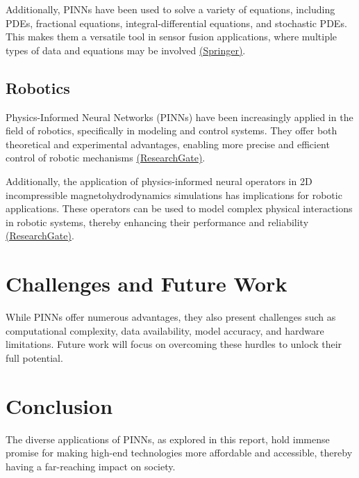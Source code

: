 \documentclass[12pt]{article}
\begin{document}
	Additionally, PINNs have been used to solve a variety of equations, including PDEs, fractional equations, integral-differential equations, and stochastic PDEs. This makes them a versatile tool in sensor fusion applications, where multiple types of data and equations may be involved \href{https://link.springer.com/article/10.1007/s10915-022-01939-z}{(Springer)}.
	
	
	\subsection{Robotics}
	Physics-Informed Neural Networks (PINNs) have been increasingly applied in the field of robotics, specifically in modeling and control systems. They offer both theoretical and experimental advantages, enabling more precise and efficient control of robotic mechanisms \href{https://www.researchgate.net/publication/370633879_Physics-informed_Neural_Networks_to_Model_and_Control_Robots_a_Theoretical_and_Experimental_Investigation}{(ResearchGate)}. 
	
	Additionally, the application of physics-informed neural operators in 2D incompressible magnetohydrodynamics simulations has implications for robotic applications. These operators can be used to model complex physical interactions in robotic systems, thereby enhancing their performance and reliability \href{https://www.researchgate.net/publication/370396402_Applications_of_physics_informed_neural_operators}{(ResearchGate)}.
	
	
	\section{Challenges and Future Work}
	While PINNs offer numerous advantages, they also present challenges such as computational complexity, data availability, model accuracy, and hardware limitations. Future work will focus on overcoming these hurdles to unlock their full potential.
	
	\section{Conclusion}
	The diverse applications of PINNs, as explored in this report, hold immense promise for making high-end technologies more affordable and accessible, thereby having a far-reaching impact on society.
	
\end{document}
